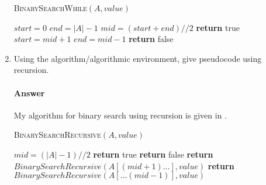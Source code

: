 \documentclass{article}
\begin{document}
\begin{enumerate}
         \begin{algorithm}
            \caption{\textsc{BinarySearchWhile}$(A, value)$}\label{alg:whileloop}
            \begin{algorithmic}
               \State $start = 0$
            \State$ end = |A|-1$
                	\State $mid = (start + end) // 2$
            			\State \textbf{return} true
					\State $start = mid + 1$
				\Else{}
					\State $end = mid-1$
      			\EndIf
                \EndWhile
                \State \textbf{return} false
            \end{algorithmic}
        \end{algorithm}

    \item Using the algorithm/algorithmic environment, give pseudocode using
        recursion.

        \paragraph{Answer} My algorithm for binary search using recursion is given in .

         \begin{algorithm}
            \caption{\textsc{BinarySearchRecursive}$(A, value)$}\label{alg:recursive}
            \begin{algorithmic}
                \State $mid = (|A|-1)//2$
            		\State \textbf{return} true
				\State \textbf{return} false 
				\State \textbf{return} $BinarySearchRecursive(A[(mid+1)\ldots], value)$
			\Else{}
				\State \textbf{return} $BinarySearchRecursive(A[\ldots(mid-1)], value)$
			\EndIf
            \end{algorithmic}
        \end{algorithm}


\end{enumerate}
\end{document}
